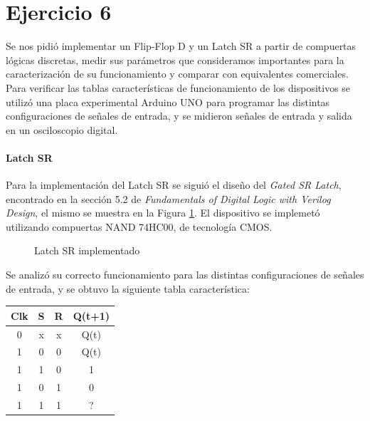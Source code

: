 
\part*{Ejercicio 6}
Se nos pidió implementar un Flip-Flop D y un Latch SR a partir de compuertas lógicas discretas, medir sus parámetros que consideramos importantes para la caracterización de su funcionamiento y comparar con equivalentes comerciales. Para verificar las tablas características de funcionamiento de los dispositivos se utilizó una placa experimental Arduino UNO para programar las distintas configuraciones de señales de entrada, y se midieron señales de entrada y salida en un osciloscopio digital. 

\subsection*{Latch SR}
Para la implementación del Latch SR se siguió el diseño del \emph{Gated SR Latch}, encontrado en la sección 5.2 de \emph{Fundamentals of Digital Logic with Verilog Design}, el mismo se muestra en la Figura \ref{6_fig1}. El dispositivo se implemetó utilizando compuertas NAND 74HC00, de tecnología CMOS.



\begin{figure}[H]
\centering

\caption{Latch SR implementado} \label{6_fig1}
\end{figure}



Se analizó su correcto funcionamiento para las distintas configuraciones de señales de entrada, y se obtuvo la siguiente tabla característica:

\begin{center}
\begin{tabular}{ccc|c}
Clk & S & R & Q(t+1) \\ 
\hline 
0 & x & x & Q(t) \\ 
1 & 0 & 0 & Q(t) \\ 
1 & 1 & 0 & 1 \\ 
1 & 0 & 1 & 0 \\ 
1 & 1 & 1 & ? \\
\end{tabular} 
\end{center}

